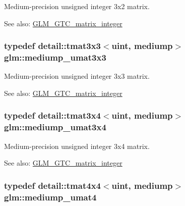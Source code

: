 Medium-precision unsigned integer 3x2 matrix. \begin{Desc}
\item[See also:]\hyperlink{group__gtc__matrix__integer}{GLM\_\-GTC\_\-matrix\_\-integer} \end{Desc}
\hypertarget{group__gtc__matrix__integer_g31a05e7b2a6a596bdc7ceeb5d9c10e1c}{
\subsubsection[mediump\_\-umat3x3]{\setlength{\rightskip}{0pt plus 5cm}typedef detail::tmat3x3$<$uint, mediump$>$ {\bf glm::mediump\_\-umat3x3}}}
\label{group__gtc__matrix__integer_g31a05e7b2a6a596bdc7ceeb5d9c10e1c}


Medium-precision unsigned integer 3x3 matrix. \begin{Desc}
\item[See also:]\hyperlink{group__gtc__matrix__integer}{GLM\_\-GTC\_\-matrix\_\-integer} \end{Desc}
\hypertarget{group__gtc__matrix__integer_g8113e067e1f327fac64cf9015c8c5431}{
\subsubsection[mediump\_\-umat3x4]{\setlength{\rightskip}{0pt plus 5cm}typedef detail::tmat3x4$<$uint, mediump$>$ {\bf glm::mediump\_\-umat3x4}}}
\label{group__gtc__matrix__integer_g8113e067e1f327fac64cf9015c8c5431}


Medium-precision unsigned integer 3x4 matrix. \begin{Desc}
\item[See also:]\hyperlink{group__gtc__matrix__integer}{GLM\_\-GTC\_\-matrix\_\-integer} \end{Desc}
\hypertarget{group__gtc__matrix__integer_gc82f1c426fbca1c4989f0985eb7a4358}{
\subsubsection[mediump\_\-umat4]{\setlength{\rightskip}{0pt plus 5cm}typedef detail::tmat4x4$<$uint, mediump$>$ {\bf glm::mediump\_\-umat4}}}
\label{group__gtc__matrix__integer_gc82f1c426fbca1c4989f0985eb7a4358}


